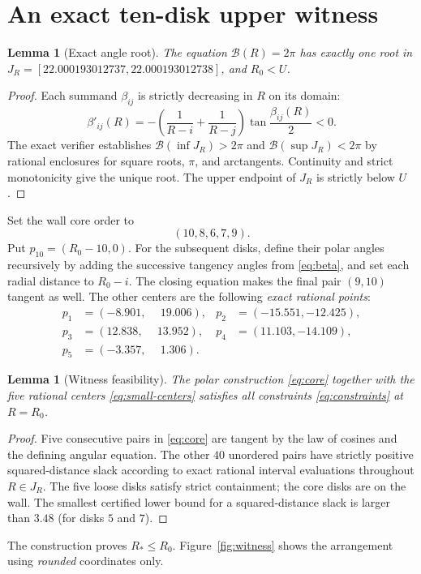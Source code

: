 \documentclass[11pt,a4paper]{article}
\newtheorem{lemma}[theorem]{Lemma}
\newcommand{\Rstar}{R_*}
\newcommand{\Rcap}{U}
\begin{document}
\section{An exact ten-disk upper witness}
\begin{lemma}[Exact angle root]\label{lem:root}
The equation $\mathcal B(R)=2\pi$ has exactly one root in
$J_R=[22.000193012737,22.000193012738]$, and $R_0<\Rcap$.
\end{lemma}
\begin{proof}
Each summand $\beta_{ij}$ is strictly decreasing in $R$ on its domain:
\[
 \beta'_{ij}(R)=-\left(\frac1{R-i}+\frac1{R-j}\right)
                  \tan\frac{\beta_{ij}(R)}{2}<0.
\]
The exact verifier establishes $\mathcal B(\inf J_R)>2\pi$ and
$\mathcal B(\sup J_R)<2\pi$ by rational enclosures for square roots,
$\pi$, and arctangents.  Continuity and strict monotonicity give the
unique root.  The upper endpoint of $J_R$ is strictly below $\Rcap$.
\end{proof}

Set the wall core order to
\begin{equation}\label{eq:core}
 (10,8,6,7,9).
\end{equation}
Put $p_{10}=(R_0-10,0)$.  For the subsequent disks, define their polar
angles recursively by adding the successive tangency angles from
\eqref{eq:beta}, and set each radial distance to $R_0-i$.
The closing equation makes the final pair $(9,10)$ tangent as well.
The other centers are the following \emph{exact rational points}:
\begin{equation}\label{eq:small-centers}
\begin{aligned}
 p_1&=(-8.901,\phantom{-}19.006),&p_2&=(-15.551,-12.425),\\
 p_3&=(12.838,\phantom{-}13.952),&p_4&=(11.103,-14.109),\\
 p_5&=(-3.357,\phantom{-}1.306).&&
\end{aligned}
\end{equation}
\begin{lemma}[Witness feasibility]\label{lem:witness}
The polar construction \eqref{eq:core} together with the five rational
centers \eqref{eq:small-centers} satisfies all constraints
\eqref{eq:constraints} at $R=R_0$.
\end{lemma}
\begin{proof}
Five consecutive pairs in \eqref{eq:core} are tangent by the law of
cosines and the defining angular equation.  The other $40$ unordered
pairs have strictly positive squared-distance slack according to exact
rational interval evaluations throughout $R\in J_R$.  The five loose
disks satisfy strict containment; the core disks are on the wall.
The smallest certified lower bound for a squared-distance slack is
larger than $3.48$ (for disks $5$ and $7$).
\end{proof}
The construction proves $\Rstar\le R_0$.  Figure~\ref{fig:witness}
shows the arrangement using \emph{rounded} coordinates only.
\end{document}
